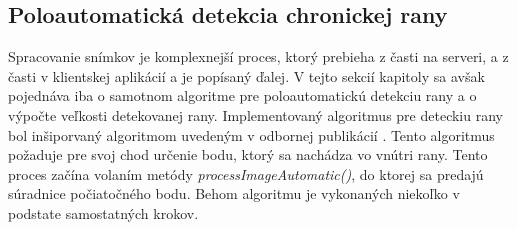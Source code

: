 \subsection{Poloautomatická detekcia chronickej rany}
Spracovanie snímkov je komplexnejší proces, ktorý prebieha z časti na serveri, a z časti v klientskej aplikácií a je popísaný ďalej. V tejto sekcií kapitoly sa avšak pojednáva iba o samotnom algoritme pre poloautomatickú detekciu rany a o výpočte veľkosti detekovanej rany. Implementovaný algoritmus pre deteckiu rany bol inšiporvaný algoritmom uvedeným v odbornej publikácií \cite{AHMADFAUZI201574}. Tento algoritmus požaduje pre svoj chod určenie bodu, ktorý sa nachádza vo vnútri rany. Tento proces začína volaním metódy \textit{processImageAutomatic()}, do ktorej sa predajú súradnice počiatočného bodu. Behom algoritmu je vykonaných niekoľko v podstate samostatných krokov. 
